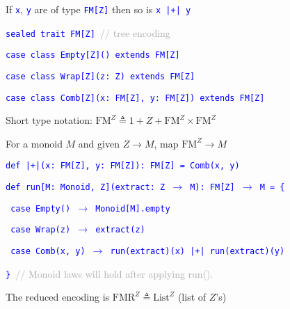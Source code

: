 If \texttt{\textcolor{blue}{\footnotesize{}x}}, \texttt{\textcolor{blue}{\footnotesize{}y}}
are of type \texttt{\textcolor{blue}{\footnotesize{}FM{[}Z{]}}} then
so is \texttt{\textcolor{blue}{\footnotesize{}x |+| y}} 

\texttt{\textcolor{blue}{\footnotesize{}sealed trait FM{[}Z{]} }}\textcolor{darkgray}{\footnotesize{}//
tree encoding}{\footnotesize\par}

\texttt{\textcolor{blue}{\footnotesize{}case class Empty{[}Z{]}()
extends FM{[}Z{]}}}{\footnotesize\par}

\texttt{\textcolor{blue}{\footnotesize{}case class Wrap{[}Z{]}(z: Z)
extends FM{[}Z{]}}}{\footnotesize\par}

\texttt{\textcolor{blue}{\footnotesize{}case class Comb{[}Z{]}(x: FM{[}Z{]},
y: FM{[}Z{]}) extends FM{[}Z{]}}}{\footnotesize\par}

Short type notation: $\text{FM}^{Z}\triangleq1+Z+\text{FM}^{Z}\times\text{FM}^{Z}$ 

For a monoid $M$ and given $Z\rightarrow M$, map $\text{FM}^{Z}\rightarrow M$

\texttt{\textcolor{blue}{\footnotesize{}def |+|(x: FM{[}Z{]}, y: FM{[}Z{]}): FM{[}Z{]}
= Comb(x, y)}}{\footnotesize\par}

\texttt{\textcolor{blue}{\footnotesize{}def run{[}M: Monoid, Z{]}(extract: Z
$\rightarrow$ M): FM{[}Z{]} $\rightarrow$ M = \{}}{\footnotesize\par}

\texttt{\textcolor{blue}{\footnotesize{}  case Empty() $\rightarrow$
Monoid{[}M{]}.empty}}{\footnotesize\par}

\texttt{\textcolor{blue}{\footnotesize{}  case Wrap(z) $\rightarrow$
extract(z)}}{\footnotesize\par}

\texttt{\textcolor{blue}{\footnotesize{}  case Comb(x, y) $\rightarrow$
run(extract)(x) |+| run(extract)(y)}}{\footnotesize\par}

\texttt{\textcolor{blue}{\footnotesize{}\} }}\textcolor{darkgray}{\footnotesize{}//
Monoid laws will hold after applying run().}{\footnotesize\par}

The reduced encoding is $\text{FMR}^{Z}\triangleq\text{List}^{Z}$
(list of $Z$\textsf{'}s)

